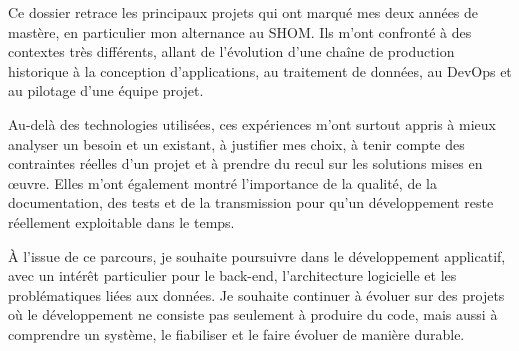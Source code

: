 Ce dossier retrace les principaux projets qui ont marqué mes deux années de mastère, en particulier mon alternance au SHOM. Ils m'ont confronté à des contextes très différents, allant de l'évolution d'une chaîne de production historique à la conception d'applications, au traitement de données, au DevOps et au pilotage d'une équipe projet.

Au-delà des technologies utilisées, ces expériences m'ont surtout appris à mieux analyser un besoin et un existant, à justifier mes choix, à tenir compte des contraintes réelles d'un projet et à prendre du recul sur les solutions mises en œuvre. Elles m'ont également montré l'importance de la qualité, de la documentation, des tests et de la transmission pour qu'un développement reste réellement exploitable dans le temps.

À l'issue de ce parcours, je souhaite poursuivre dans le développement applicatif, avec un intérêt particulier pour le back-end, l'architecture logicielle et les problématiques liées aux données. Je souhaite continuer à évoluer sur des projets où le développement ne consiste pas seulement à produire du code, mais aussi à comprendre un système, le fiabiliser et le faire évoluer de manière durable.
